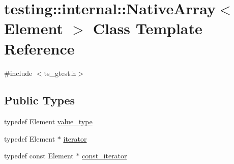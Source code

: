 \hypertarget{classtesting_1_1internal_1_1NativeArray}{\section{testing\-:\-:internal\-:\-:Native\-Array$<$ Element $>$ Class Template Reference}
\label{classtesting_1_1internal_1_1NativeArray}
}


{\ttfamily \#include $<$ts\-\_\-gtest.\-h$>$}

\subsection*{Public Types}
\begin{DoxyCompactItemize}
\item 
typedef Element \hyperlink{classtesting_1_1internal_1_1NativeArray_a12216d686e16e4cc63d952fada5b2ba9}{value\-\_\-type}
\item 
typedef Element $\ast$ \hyperlink{classtesting_1_1internal_1_1NativeArray_ac1301a57977b57a1ad013e4e25fc2a72}{iterator}
\item 
typedef const Element $\ast$ \hyperlink{classtesting_1_1internal_1_1NativeArray_a9ce7c8408460d7158a2870456d134557}{const\-\_\-iterator}
\end{DoxyCompactItemize}
